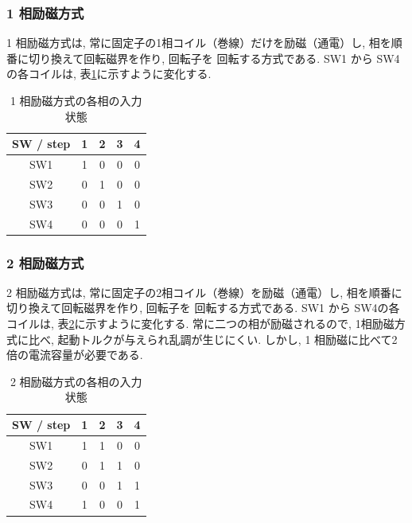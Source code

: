 \documentclass{ltjsarticle} %
\begin{document}
\subsubsection{1 相励磁⽅式}
1 相励磁⽅式は, 常に固定⼦の1相コイル（巻線）だけを励磁（通電）し, 相を順番に切り換えて回転磁界を作り, 回転⼦を
回転する⽅式である. SW1 から SW4の各コイルは, 表\ref{tab:motor1}に示すように変化する. 

\begin{table}[H] %
  \centering %
  \caption{1 相励磁⽅式の各相の入力状態}
  \begin{tabular}{|c|c|c|c|c|} 
  \hline %
  SW / step & 1 & 2 & 3 & 4 \\ \hline %
  SW1 & 1 & 0 & 0 & 0 \\ \hline
  SW2 & 0 & 1 & 0 & 0 \\ \hline
  SW3 & 0 & 0 & 1 & 0 \\ \hline
  SW4 & 0 & 0 & 0 & 1 \\ \hline

  \end{tabular}
  \label{tab:motor1} %
\end{table}


\subsubsection{2 相励磁⽅式}
2 相励磁⽅式は, 常に固定⼦の2相コイル（巻線）を励磁（通電）し, 相を順番に切り換えて回転磁界を作り, 回転⼦を
回転する⽅式である. SW1 から SW4の各コイルは, 表\ref{tab:motor2}に示すように変化する. 
常に⼆つの相が励磁されるので, 1相励磁⽅式に比べ, 起動トルクが与えられ乱調が⽣じにくい.
しかし,  1 相励磁に⽐べて2倍の電流容量が必要である.  

\begin{table}[H] %
  \centering %
  \caption{2 相励磁⽅式の各相の入力状態}
  \begin{tabular}{|c|c|c|c|c|} 
  \hline %
  SW / step & 1 & 2 & 3 & 4 \\ \hline %
  SW1 & 1 & 1 & 0 & 0 \\ \hline
  SW2 & 0 & 1 & 1 & 0 \\ \hline
  SW3 & 0 & 0 & 1 & 1 \\ \hline
  SW4 & 1 & 0 & 0 & 1 \\ \hline

  \end{tabular}
  \label{tab:motor2} %
\end{table}
\end{document}
